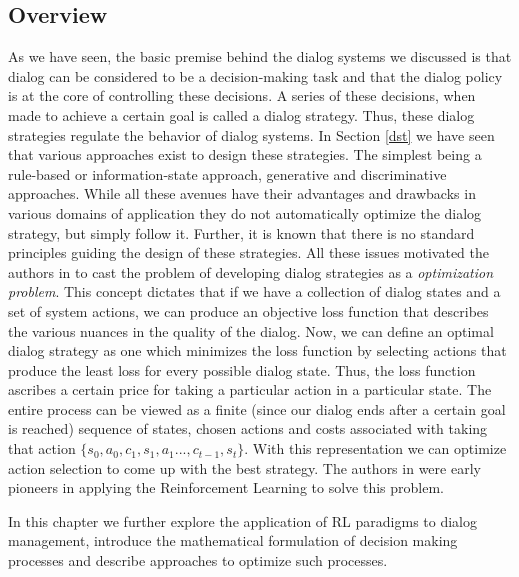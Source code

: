 \documentclass[12pt]{extarticle}
\numberwithin{equation}{section}
\begin{document}
	\subsection{Overview}
	As we have seen, the basic premise behind the dialog systems we discussed is that dialog can be considered to be a decision-making task and that the dialog policy is at the core of controlling these decisions. A series of these decisions, when made to achieve a certain goal is called a dialog strategy. Thus, these dialog strategies regulate the behavior of dialog systems. In Section \ref{dst} we have seen that various approaches exist to design these strategies. The simplest being a rule-based or information-state approach, generative and discriminative approaches.  While all these avenues have their advantages and drawbacks in various domains of application they do not automatically optimize the dialog strategy, but simply follow it. Further, it is known that there is no standard principles guiding the design of these strategies. All these issues motivated the authors in \cite{Levin97astochastic} to cast the problem of developing dialog strategies as a \textit{optimization problem}. This concept dictates that if we have a collection of dialog states and a set of system actions, we can produce an objective loss function that describes the various nuances in the quality of the dialog. Now, we can define an optimal dialog strategy as one which minimizes the loss function by selecting actions that produce the least loss for every possible dialog state. Thus, the loss function ascribes a certain price for taking a particular action in a particular state. The entire process can be viewed as a finite (since our dialog ends after a certain goal is reached) sequence of states, chosen actions and costs associated with taking that action $\{s_0,a_0,c_1,s_1,a_1...,c_{t-1},s_t\}$. With this representation we can optimize action selection to come up with the best strategy. The authors in \cite{Levin97astochastic}\cite{mdp-pieraccini} were early pioneers in applying the Reinforcement Learning to solve this problem. \par
	In this chapter we further explore the application of RL paradigms to dialog management, introduce the mathematical formulation of decision making processes and describe approaches to optimize such processes.
\end{document}
